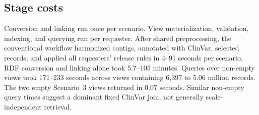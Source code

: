 \documentclass[11pt]{article}
\begin{document}
\subsection{Stage costs}\label{subsec:usecase-costs}
Conversion and linking run once per scenario.
View materialization, validation, indexing, and querying run per requester.
After shared preprocessing, the conventional workflow harmonized contigs, annotated with ClinVar, selected records, and applied all requesters' release rules in 4--91 seconds per scenario.
RDF conversion and linking alone took 5.7--105 minutes.
Queries over non-empty views took 171--233 seconds across views containing 6,397 to 5.06 million records.
The two empty Scenario~3 views returned in 0.07 seconds.
Similar non-empty query times suggest a dominant fixed ClinVar join, not generally scale-independent retrieval.
\end{document}
